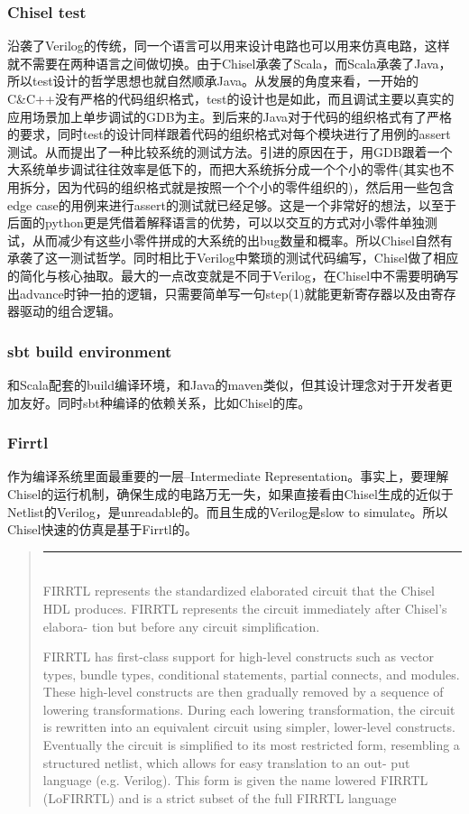 \documentclass[twocolumn,10pt]{article}
\newenvironment{commentary}
{ \vspace{-0.1in}
  \begin{quotation}
  \noindent
  \small \em
  \rule{\linewidth}{1pt}\\
}
{
  \end{quotation}
}
\begin{document}
	\subsubsection{Chisel test}
	沿袭了Verilog的传统，同一个语言可以用来设计电路也可以用来仿真电路，这样就不需要在两种语言之间做切换。由于Chisel承袭了Scala，而Scala承袭了Java，所以test设计的哲学思想也就自然顺承Java。从发展的角度来看，一开始的C\&C++没有严格的代码组织格式，test的设计也是如此，而且调试主要以真实的应用场景加上单步调试的GDB为主。到后来的Java对于代码的组织格式有了严格的要求，同时test的设计同样跟着代码的组织格式对每个模块进行了用例的assert测试。从而提出了一种比较系统的测试方法。引进的原因在于，用GDB跟着一个大系统单步调试往往效率是低下的，而把大系统拆分成一个个小的零件(其实也不用拆分，因为代码的组织格式就是按照一个个小的零件组织的)，然后用一些包含edge case的用例来进行assert的测试就已经足够。这是一个非常好的想法，以至于后面的python更是凭借着解释语言的优势，可以以交互的方式对小零件单独测试，从而减少有这些小零件拼成的大系统的出bug数量和概率。所以Chisel自然有承袭了这一测试哲学。同时相比于Verilog中繁琐的测试代码编写，Chisel做了相应的简化与核心抽取。最大的一点改变就是不同于Verilog，在Chisel中不需要明确写出advance时钟一拍的逻辑，只需要简单写一句step(1)就能更新寄存器以及由寄存器驱动的组合逻辑。
 	\subsubsection{sbt build environment}
 	和Scala配套的build编译环境，和Java的maven类似，但其设计理念对于开发者更加友好。同时sbt种编译的依赖关系，比如Chisel的库。
	\subsubsection{Firrtl}
	作为编译系统里面最重要的一层--Intermediate Representation。事实上，要理解Chisel的运行机制，确保生成的电路万无一失，如果直接看由Chisel生成的近似于Netlist的Verilog，是unreadable的。而且生成的Verilog是slow to simulate。所以Chisel快速的仿真是基于Firrtl的。
	\begin{commentary}
		FIRRTL represents the standardized elaborated circuit that the Chisel HDL
		produces. FIRRTL represents the circuit immediately after Chisel’s elabora-
		tion but before any circuit simplification.
		
		FIRRTL has first-class support for high-level constructs
		such as vector types, bundle types, conditional statements, partial connects,
		and modules. These high-level constructs are then gradually removed by a
		sequence of lowering transformations. During each lowering transformation,
		the circuit is rewritten into an equivalent circuit using simpler, lower-level
		constructs. Eventually the circuit is simplified to its most restricted form,
		resembling a structured netlist, which allows for easy translation to an out-
		put language (e.g. Verilog). This form is given the name lowered FIRRTL
		(LoFIRRTL) and is a strict subset of the full FIRRTL language
	\end{commentary}
\end{document}
